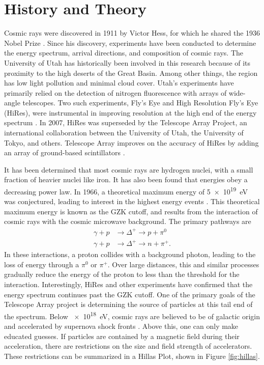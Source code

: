 \section{History and Theory}

Cosmic rays were discovered in 1911 by Victor Hess, for which he shared the 1936 Nobel Prize \cite{pleijel1936hessnobel}. Since his discovery, experiments have been conducted to determine the energy spectrum, arrival directions, and composition of cosmic rays.  The University of Utah has historically been involved in this research because of its proximity to the high deserts of the Great Basin. Among other things, the region has low light pollution and minimal cloud cover. Utah's experiments have primarily relied on the detection of nitrogen fluorescence with arrays of wide-angle telescopes. Two such experiments, Fly's Eye and High Resolution Fly's Eye (HiRes), were  instrumental in improving resolution at the high end of the energy spectrum \cite{abuzayyad2000hires, bird1994flyseye}. In 2007, HiRes was superseded by the Telescope Array Project, an international collaboration between the University of Utah, the University of Tokyo, and others. Telescope Array improves on the accuracy of HiRes by adding an array of ground-based scintillators \cite{stratton2012ta}.

It has been determined that most cosmic rays are hydrogen nuclei, with a small fraction of heavier nuclei like iron. It has also been found that energies obey a decreasing power law. In 1966, a theoretical maximum energy of \SI{5e19}{eV} was conjectured, leading to interest in the highest energy events \cite{greisen1966cutoff, zatsepin1966cutoff}. This theoretical maximum energy is known as the GZK cutoff, and results from the interaction of cosmic rays with the cosmic microwave background. The primary pathways are
\begin{equation}
\begin{aligned}
    \gamma + p &\rightarrow \Delta^+ \rightarrow p + \pi^0 \\
    \gamma + p &\rightarrow \Delta^+ \rightarrow n + \pi^+.
\end{aligned}
\end{equation}
In these interactions, a proton collides with a background photon, leading to the loss of energy through a $\pi^0$ or $\pi^+$. Over large distances, this and similar processes gradually reduce the energy of the proton to less than the threshold for the interaction. Interestingly, HiRes and other experiments have confirmed that the energy spectrum continues past the GZK cutoff. One of the primary goals of the Telescope Array project is determining the source of particles at this tail end of the spectrum. Below \SI{e18}{eV}, cosmic rays are believed to be of galactic origin and accelerated by supernova shock fronts \cite{abuzayyad2000hires}. Above this, one can only make educated guesses. If particles are contained by a magnetic field during their acceleration, there are restrictions on the size and field strength of accelerators. These restrictions can be summarized in a Hillas Plot, shown in Figure \ref{fig:hillas}. 

